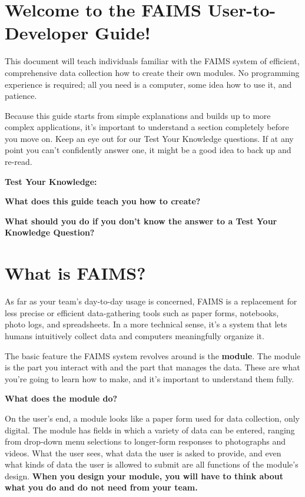 \section[welcome-to-the-faims-user-to-developer-guide]{Welcome to the FAIMS User-to-Developer Guide!}

This document will teach individuals familiar with the FAIMS system of efficient, comprehensive data collection how to create their own modules. No programming experience is required; all you need is a computer, some idea how to use it, and patience.

Because this guide starts from simple explanations and builds up to more complex applications, it's important to understand a section completely before you move on. Keep an eye out for our Test Your Knowledge questions. If at any point you can't confidently answer one, it might be a good idea to back up and re-read.

{\bf Test Your Knowledge:}

{\bf What does this guide teach you how to create?}

{\bf What should you do if you don't know the answer to a Test Your Knowledge Question?}

\section[what-is-faims]{What is FAIMS?}

As far as your team's day-to-day usage is concerned, FAIMS is a replacement for less precise or efficient data-gathering tools such as paper forms, notebooks, photo logs, and spreadsheets. In a more technical sense, it's a system that lets humans intuitively collect data and computers meaningfully organize it.

The basic feature the FAIMS system revolves around is the {\bf module}. The module is the part you interact with and the part that manages the data. These are what you're going to learn how to make, and it's important to understand them fully.

{\bf What does the module do?}

On the user's end, a module looks like a paper form used for data collection, only digital. The module has fields in which a variety of data can be entered, ranging from drop-down menu selections to longer-form responses to photographs and videos. What the user sees, what data the user is asked to provide, and even what kinds of data the user is allowed to submit are all functions of the module's design. {\bf When you design your module, you will have to think about what you do and do not need from your team.}


